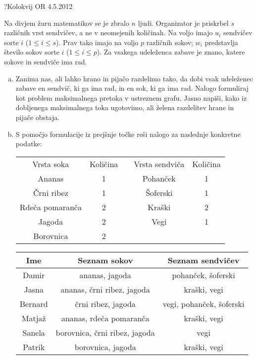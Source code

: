 \begin{naloga}{?}{Kolokvij OR 4.5.2012}
\begin{vprasanje}[divjizur]
Na divjem žuru matematikov se je zbralo $n$ ljudi.
Organizator je priskrbel $s$ različnih vrst sendvičev,
a ne v neomejenih količinah.
Na voljo imajo $u_i$ sendvičev sorte $i$ ($1 \le i \le s$).
Prav tako imajo na voljo $p$ različnih sokov;
$w_i$ predstavlja število sokov sorte $i$ ($1 \le i \le p$).
Za vsakega udeleženca zabave je znano,
katere sokove in sendviče ima rad.

\begin{enumerate}[(a)]
\item Zanima nas, ali lahko hrano in pijačo razdelimo tako,
da dobi vsak udeleženec zabave en sendvič, ki ga ima rad,
in en sok, ki ga ima rad.
Nalogo formuliraj kot problem maksimalnega pretoka v ustreznem grafu.
Jasno napiši, kako iz dobljenega maksimalnega toka ugotovimo,
ali želena razdelitev hrane in pijače obstaja.

\item S pomočjo formulacije iz prejšnje točke
reši nalogo za naslednje konkretne podatke:
\begin{center}
\begin{tabular}{c|ccc|c}
Vrsta soka & Količina & \quad & Vrsta sendviča & Količina \\
\cline{1-2} \cline{4-5}
Ananas          & 1 && Pohanček & 1 \\
Črni ribez      & 1 && Šoferski & 1 \\
Rdeča pomaranča & 2 && Kraški   & 2 \\
Jagoda          & 2 && Vegi     & 1 \\
Borovnica       & 2
\end{tabular}

\bigskip
\begin{tabular}{c|c|c}
Ime & Seznam sokov & Seznam sendvičev \\ \hline
Damir   & ananas, jagoda                & pohanček, šoferski       \\
Jasna   & ananas, črni ribez, jagoda    & kraški, vegi             \\
Bernard & črni ribez, jagoda            & vegi, pohanček, šoferski \\
Matjaž  & ananas, rdeča pomaranča       & kraški, vegi             \\
Sanela  & borovnica, črni ribez, jagoda & vegi                     \\
Patrik  & borovnica, jagoda             & kraški, vegi
\end{tabular}
\end{center}
\end{enumerate}
\end{vprasanje}
\begin{odgovor}
\end{odgovor}
\end{naloga}


